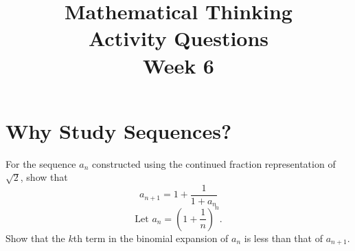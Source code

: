 \documentclass[12pt, answers, a4paper]{exam}
\title{\begin{framed}
    \textbf{Mathematical Thinking}\\Activity Questions\\Week 6
\end{framed}}
\date{}
\begin{document}
\maketitle

\setlength{\rightpointsmargin}{5pt}
\marginpointname{ \points}
\marksnotpoints
{}
\pointsinrightmargin

\unframedsolutions
\section{Why Study Sequences?}
\begin{questions}
\question For the sequence $a_n$ constructed using the continued fraction representation of $\sqrt{2}$, show that
\begin{equation*}
    a_{n+1} = 1 + \frac{1}{1+a_n}
\end{equation*}
\question 
\begin{equation*}
    \text{Let } a_n = \left( 1 + \frac{1}{n} \right)^n.
\end{equation*}
Show that the $k$th term in the binomial expansion of $a_n$ is less than that of $a_{n+1}$.
\end{questions}
\end{document}
